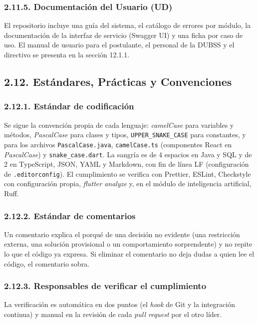 \subsubsection{2.11.5. Documentación del Usuario (UD)}

El repositorio incluye una guía del sistema, el catálogo de errores por módulo, la documentación de la interfaz de servicio (Swagger UI) y una ficha por caso de uso. El manual de usuario para el postulante, el personal de la DUBSS y el directivo se presenta en la sección 12.1.1.

\subsection{2.12. Estándares, Prácticas y Convenciones}

\subsubsection{2.12.1. Estándar de codificación}

Se sigue la convención propia de cada lenguaje: \textit{camelCase} para variables y métodos, \textit{PascalCase} para clases y tipos, \texttt{UPPER\_SNAKE\_CASE} para constantes, y para los archivos \texttt{PascalCase.java}, \texttt{camelCase.ts} (componentes React en \textit{PascalCase}) y \texttt{snake\_case.dart}. La sangría es de 4 espacios en Java y SQL y de 2 en TypeScript, JSON, YAML y Markdown, con fin de línea LF (configuración de \texttt{.editorconfig}). El cumplimiento se verifica con Prettier, ESLint, Checkstyle con configuración propia, \textit{flutter analyze} y, en el módulo de inteligencia artificial, Ruff.

\subsubsection{2.12.2. Estándar de comentarios}

Un comentario explica el porqué de una decisión no evidente (una restricción externa, una solución provisional o un comportamiento sorprendente) y no repite lo que el código ya expresa. Si eliminar el comentario no deja dudas a quien lee el código, el comentario sobra.

\subsubsection{2.12.3. Responsables de verificar el cumplimiento}

La verificación es automática en dos puntos (el \textit{hook} de Git y la integración continua) y manual en la revisión de cada \textit{pull request} por el otro líder.

